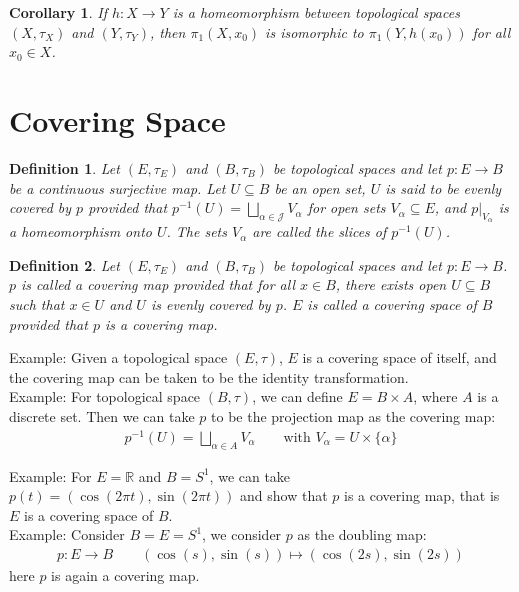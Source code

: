 \documentclass[11pt]{book}
\theoremstyle{break}
\theoremstyle{break}
\newtheorem{corT}[lem]{Corollary}
\newtheorem{defn}{Definition}[corL]
\newcommand{\R}{\mathbb{R}}
\newcommand{\example}{\color{green}Example: \color{black}}
\begin{document}
\begin{corT}
If $h:X \to Y$ is a homeomorphism between topological spaces $(X,\tau_X)$ and $(Y,\tau_Y)$, then $\pi_1(X,x_0)$ is isomorphic to $\pi_1(Y,h(x_0))$ for all $x_0 \in X$. 
\end{corT}


\newpage
\section[Covering Space]{\color{red}Covering Space\color{black}}
\begin{defn}
Let $(E,\tau_E)$ and $(B,\tau_B)$ be topological spaces and let $p:E \to B$ be a continuous surjective map. Let $U \subseteq B$ be an open set, $U$ is said to be evenly covered by $p$ provided that $p^{-1}(U) = \bigsqcup_{\alpha \in \mathcal{J}}V_\alpha$ for open sets $V_\alpha \subseteq E$, and $p|_{V_\alpha}$ is a homeomorphism onto $U$. The sets $V_\alpha$ are called the slices of $p^{-1}(U)$. 
\end{defn}

\begin{defn}
Let $(E,\tau_E)$ and $(B,\tau_B)$ be topological spaces and let $p:E \to B$. $p$ is called a covering map provided that for all $x \in B$, there exists open $U\subseteq B$ such that $x \in U$ and $U$ is evenly covered by $p$. $E$ is called a covering space of $B$ provided that $p$ is a covering map.
\end{defn}

\example Given a topological space $(E,\tau)$, $E$ is a covering space of itself, and the covering map can be taken to be the identity transformation.\\

\example For topological space $(B,\tau)$, we can define $E = B \times A$, where $A$ is a discrete set. Then we can take $p $ to be the projection map as the covering map:
\begin{align*}
p^{-1}(U) = \bigsqcup_{\alpha \in A} V_\alpha \qquad \text{with }V_\alpha = U\times \{\alpha\}
\end{align*}

\example For $E = \R$ and $B = S^1$, we can take $p(t) = (\cos(2\pi t), \sin(2\pi t))$ and show that $p$ is a covering map, that is $E$ is a covering space of $B$. \\


\example 
Consider $B = E = S^1$, we consider $p$ as the doubling map:
\begin{align*}
p:E \to B \qquad	 (\cos(s),\sin(s)) \mapsto (\cos(2s), \sin(2s))
\end{align*}
here $p$ is again a covering map. \\
\end{document}
